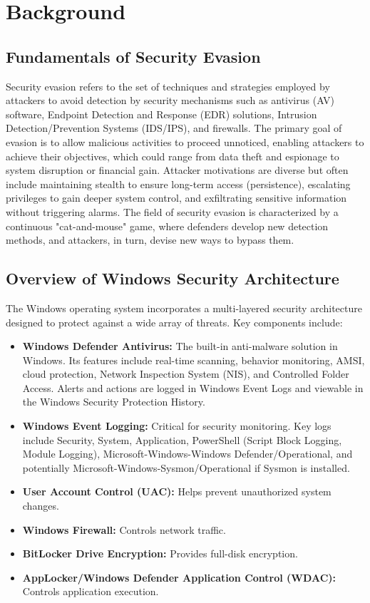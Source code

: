 \documentclass[11pt]{article}
\begin{document}
	\section{Background}
	\subsection{Fundamentals of Security Evasion}
	Security evasion refers to the set of techniques and strategies employed by attackers to avoid detection by security mechanisms such as antivirus (AV) software, Endpoint Detection and Response (EDR) solutions, Intrusion Detection/Prevention Systems (IDS/IPS), and firewalls. The primary goal of evasion is to allow malicious activities to proceed unnoticed, enabling attackers to achieve their objectives, which could range from data theft and espionage to system disruption or financial gain. Attacker motivations are diverse but often include maintaining stealth to ensure long-term access (persistence), escalating privileges to gain deeper system control, and exfiltrating sensitive information without triggering alarms. The field of security evasion is characterized by a continuous "cat-and-mouse" game, where defenders develop new detection methods, and attackers, in turn, devise new ways to bypass them.
	
	\subsection{Overview of Windows Security Architecture}
	The Windows operating system incorporates a multi-layered security architecture designed to protect against a wide array of threats. Key components include:
	\begin{itemize}
		\item \textbf{Windows Defender Antivirus:} The built-in anti-malware solution in Windows. Its features include real-time scanning, behavior monitoring, AMSI, cloud protection, Network Inspection System (NIS), and Controlled Folder Access. Alerts and actions are logged in Windows Event Logs and viewable in the Windows Security Protection History.
		\item \textbf{Windows Event Logging:} Critical for security monitoring. Key logs include Security, System, Application, PowerShell (Script Block Logging, Module Logging), Microsoft-Windows-Windows Defender/Operational, and potentially Microsoft-Windows-Sysmon/Operational if Sysmon is installed.
		\item \textbf{User Account Control (UAC):} Helps prevent unauthorized system changes.
		\item \textbf{Windows Firewall:} Controls network traffic.
		\item \textbf{BitLocker Drive Encryption:} Provides full-disk encryption.
		\item \textbf{AppLocker/Windows Defender Application Control (WDAC):} Controls application execution.
	\end{itemize}
	
\end{document}
